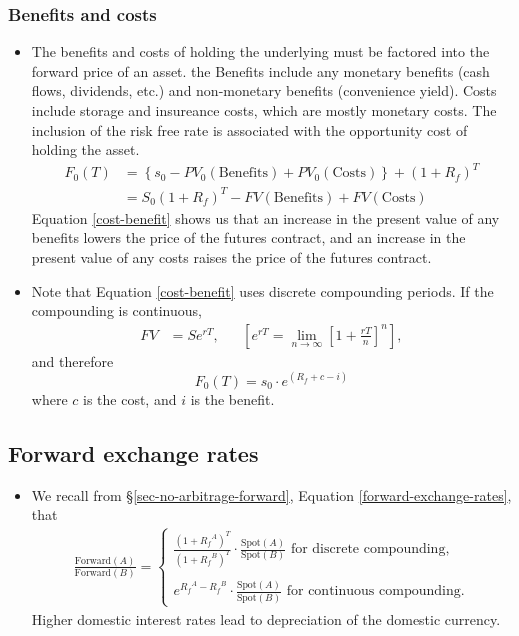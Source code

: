 \documentclass[../notes_compiled.tex]{subfiles}
\begin{document}
\subsubsection*{Benefits and costs}
\begin{itemize}
\item The benefits and costs of holding the underlying must be factored into the forward price of an asset. the Benefits include any monetary benefits (cash flows, dividends, etc.) and non-monetary benefits (convenience yield). Costs include storage and insureance costs, which are mostly monetary costs. The inclusion of the risk free rate is associated with the opportunity cost of holding the asset.
\begin{align}
F_{0}(T) &= \left\{ s_{0} - PV_{0}(\text{Benefits}) + PV_{0}(\text{Costs}) \right\} + (1+R_{f})^{T} \label{cost-benefit} \\
&= S_{0}(1+R_{f})^{T} - FV(\text{Benefits}) + FV(\text{Costs}) \nonumber
\end{align}
Equation \ref{cost-benefit} shows us that an increase in the present value of any benefits lowers the price of the futures contract, and an increase in the present value of any costs raises the price of the futures contract.

\item Note that Equation \ref{cost-benefit} uses discrete compounding periods. If the compounding is continuous, 
\begin{align}
& & FV &= Se^{rT}, & &\left[e^{rT} = \lim_{n\rightarrow\infty}\left[1+\frac{rT}{n}\right]^{n}\right], &&
\end{align}
and therefore
\begin{equation}
F_{0}(T) = s_{0}\cdot e^{(R_{f} + c - i)}
\end{equation}
where $c$ is the cost, and $i$ is the benefit.
\end{itemize}

\subsection{Forward exchange rates}
\begin{itemize}
\item We recall from \S\ref{sec-no-arbitrage-forward}, Equation \ref{forward-exchange-rates}, that 
\begin{align}
\frac{\text{Forward}(A)}{\text{Forward}(B)} = \begin{cases}\frac{(1+{R_{f}}^{A})^{T}}{(1+{R_{f}}^{B})^{T}} \cdot \frac{\text{Spot}(A)}{\text{Spot}(B)} \text{ for discrete compounding,} \\ \\
e^{{R_{f}}^{A} - {R_{f}}^{B}} \cdot \frac{\text{Spot}(A)}{\text{Spot}(B)} \text{ for continuous compounding.} \end{cases}
\end{align}
Higher domestic interest rates lead to depreciation of the domestic currency.
\end{itemize}
\end{document}
